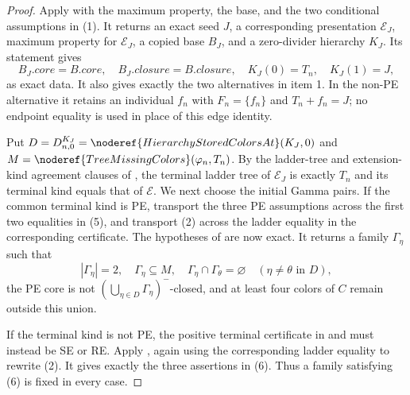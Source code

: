 \begin{proof}
Apply  with the maximum property, the base,
and the two conditional assumptions in (1).  It returns an exact seed
$J$, a corresponding presentation $\mathcal E_J$, maximum
property for $\mathcal E_J$, a copied base $B_J$, and a zero-divider
hierarchy $K_J$.  Its statement gives
\[
 B_J.\mathit{core}=B.\mathit{core},\quad
 B_J.\mathit{closure}=B.\mathit{closure},\quad
 K_J(0)=T_n,\quad K_J(1)=J,                                  \tag{5}
\]
as exact data.  It also gives exactly the two alternatives in item 1.  In
the non-PE alternative it retains an individual $f_n$ with
$F_n=\{f_n\}$ and $T_n+f_n=J$; no endpoint equality is used in place of
this edge identity.

Put $D=D^{K_J}_{n,0}=\noderef{HierarchyStoredColorsAt}(K_J,0)$ and
$M=\noderef{TreeMissingColors}(\varphi_n,T_n)$.  By the ladder-tree and
extension-kind agreement clauses of
, the terminal ladder tree of
$\mathcal E_J$ is exactly $T_n$ and its terminal kind equals that of
$\mathcal E$.  We next choose the initial Gamma pairs.  If the common
terminal kind is PE, transport the three PE assumptions across the first
two equalities in (5), and transport (2) across the ladder equality in the
corresponding certificate.  The hypotheses of
 are now exact.  It returns a family
$\Gamma_\eta$ such that
\[
 |\Gamma_\eta|=2,\quad \Gamma_\eta\subseteq M,\quad
 \Gamma_\eta\cap\Gamma_\theta=\varnothing
       \quad(\eta\ne\theta\text{ in }D),                       \tag{6}
\]
the PE core is not $(\bigcup_{\eta\in D}\Gamma_\eta)^-$-closed,
and at least four colors of $C$ remain outside this union.

If the terminal kind is not PE, the positive terminal certificate in
 and  must instead
be SE or RE.  Apply
, again using the corresponding
ladder equality to rewrite (2).  It gives exactly the three assertions in
(6).  Thus a family satisfying (6) is fixed in every case.


\end{proof}
